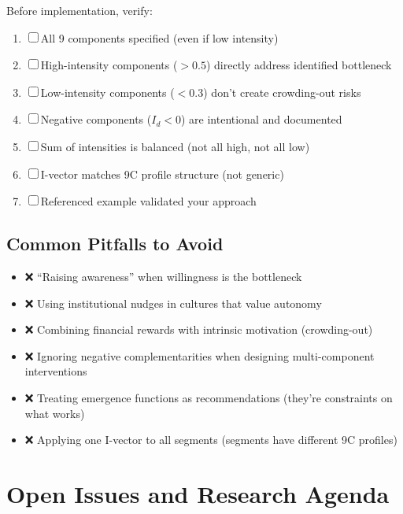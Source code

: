 Before implementation, verify:

\begin{enumerate}[nosep]
\item ☐ All 9 components specified (even if low intensity)
\item ☐ High-intensity components ($> 0.5$) directly address identified bottleneck
\item ☐ Low-intensity components ($< 0.3$) don't create crowding-out risks
\item ☐ Negative components ($I_d < 0$) are intentional and documented
\item ☐ Sum of intensities is balanced (not all high, not all low)
\item ☐ I-vector matches 9C profile structure (not generic)
\item ☐ Referenced example validated your approach
\end{enumerate}

\subsection{Common Pitfalls to Avoid}

\begin{itemize}
\item ❌ ``Raising awareness'' when willingness is the bottleneck
\item ❌ Using institutional nudges in cultures that value autonomy
\item ❌ Combining financial rewards with intrinsic motivation (crowding-out)
\item ❌ Ignoring negative complementarities when designing multi-component interventions
\item ❌ Treating emergence functions as recommendations (they're constraints on what works)
\item ❌ Applying one I-vector to all segments (segments have different 9C profiles)
\end{itemize}

\section{Open Issues and Research Agenda}
\label{sec:hhh-open}

